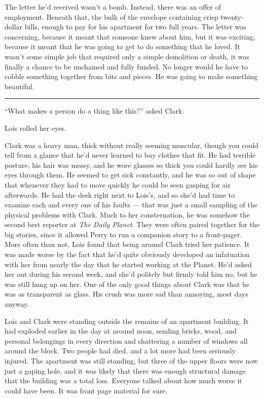 The letter he'd received wasn't a bomb. Instead, there was an offer of
employment. Beneath that, the bulk of the envelope containing crisp
twenty‐dollar bills, enough to pay for his apartment for two full years.
The letter was concerning, because it meant that someone knew about him,
but it was exciting, because it meant that he was going to get to do
something that he loved. It wasn't some simple job that required only a
simple demolition or death, it was finally a chance to be unchained and
fully funded. No longer would he have to cobble something together from
bits and pieces. He was going to make something beautiful.

\begin{center}\rule{0.5\linewidth}{0.5pt}\end{center}

``What makes a person do a thing like this?'' asked Clark.

Lois rolled her eyes.

Clark was a heavy man, thick without really seeming muscular, though you
could tell from a glance that he'd never learned to buy clothes that
fit. He had terrible posture, his hair was messy, and he wore glasses so
thick you could hardly see his eyes through them. He seemed to get sick
constantly, and he was so out of shape that whenever they had to move
quickly he could be seen gasping for air afterwards. He had the desk
right next to Lois's, and so she'd had time to examine each and every
one of his faults --- that was just a small sampling of the physical
problems with Clark. Much to her consternation, he was somehow the
second best reporter at \emph{The Daily Planet}. They were often paired
together for the big stories, since it allowed Perry to run a companion
story to a front‐pager. More often than not, Lois found that being
around Clark tried her patience. It was made worse by the fact that he'd
quite obviously developed an infatuation with her from nearly the day
that he started working at the Planet. He'd asked her out during his
second week, and she'd politely but firmly told him no, but he was still
hung up on her. One of the only good things about Clark was that he was
as transparent as glass. His crush was more sad than annoying, most days
anyway.

Lois and Clark were standing outside the remains of an apartment
building. It had exploded earlier in the day at around noon, sending
bricks, wood, and personal belongings in every direction and shattering
a number of windows all around the block. Two people had died, and a lot
more had been seriously injured. The apartment was still standing, but
three of the upper floors were now just a gaping hole, and it was likely
that there was enough structural damage that the building was a total
loss. Everyone talked about how much worse it could have been. It was
front page material for sure.


